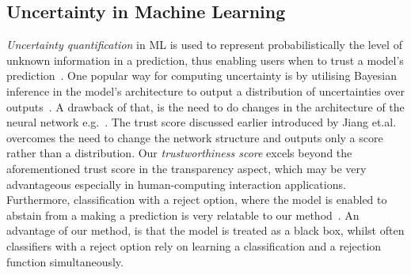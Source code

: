 \subsection{Uncertainty in Machine Learning}
\textit{Uncertainty quantification} in ML is used to represent probabilistically the level of unknown information in a prediction, thus enabling users when to trust a model's prediction~\cite{ghahramani2015probabilistic}\cite{tran2022plex}.
%
One popular way for computing uncertainty is by utilising Bayesian inference in the model's architecture to output a distribution of uncertainties over outputs~\cite{gal2016dropout}\cite{ABDAR2021}. 
%
A drawback of that, is the need to do changes in the architecture of the neural network e.g.~\cite{Kraus2019}.
%
The trust score discussed earlier introduced by Jiang et.al. ~\cite{Jiang2018} overcomes the need to change the network structure and outputs only a score rather than a distribution.
%
Our \textit{trustworthiness score} excels beyond the aforementioned trust score in the transparency aspect, which may be very advantageous especially in human-computing interaction applications. 
%
Furthermore, classification with a reject option, where the model is enabled to abstain from a making a prediction is very relatable to our method~\cite{hendrickx2021machine}. 
%
An advantage of our method, is that the model is treated as a black box, whilst often classifiers with a reject option rely on learning a classification and a rejection function simultaneously. 


